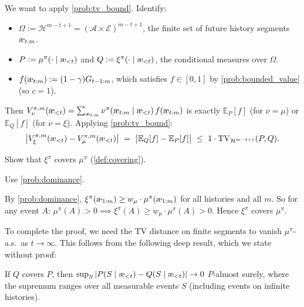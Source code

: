 \documentclass[fontsize=11pt, parskip=half]{scrartcl}
\newcommand{\cA}{\mathcal{A}}
\newcommand{\cE}{\mathcal{E}}
\newcommand{\cH}{\mathcal{H}}
\newcommand{\Ex}{\mathbb{E}}
\newcommand{\TV}[1][]{\mathrm{TV}_{#1}}
\newcommand{\aes}{\textnormal{\ae}}
\begin{document}
\begin{solution}
We want to apply \cref{prob:tv_bound}. Identify:
\begin{itemize}\itemsep=2pt
    \item $\Omega := \cH^{m-t+1} = (\cA \times \cE)^{m-t+1}$, the finite set of future history segments $\aes_{t:m}$.
    \item $P := \mu^\pi(\cdot \mid \aes_{<t})$ and $Q := \xi^\pi(\cdot \mid \aes_{<t})$, the conditional measures over $\Omega$.
    \item $f(\aes_{t:m}) := (1-\gamma)G_{t-1:m}$, which satisfies $f \in [0,1]$ by \cref{prob:bounded_value} (so $c = 1$).
\end{itemize}
Then $V_\nu^{\pi,m}(\aes_{<t}) = \sum_{\aes_{t:m}} \nu^\pi(\aes_{t:m} \mid \aes_{<t})\, f(\aes_{t:m})$ is exactly $\Ex_P[f]$ (for $\nu = \mu$) or $\Ex_Q[f]$ (for $\nu = \xi$).
Applying \cref{prob:tv_bound}:
\[
    \big|V_\xi^{\pi,m}(\aes_{<t}) - V_\mu^{\pi,m}(\aes_{<t})\big|
    ~=~ \big|\Ex_Q[f] - \Ex_P[f]\big|
    ~\leq~ 1 \cdot \TV[\cH^{m-t+1}](P, Q).
\]
\end{solution}

\begin{exercise}[Covering]
\label{prob:covering_proof}
Show that $\xi^\pi$ covers $\mu^\pi$ (\cref{def:covering}).


\begin{hint}
Use \cref{prob:dominance}.
\end{hint}
\end{exercise}

\begin{solution}
By \cref{prob:dominance}, $\xi^\pi(\aes_{1:m}) \geq w_\mu \cdot \mu^\pi(\aes_{1:m})$ for all histories and all $m$.
So for any event $A$: $\mu^\pi(A) > 0 \implies \xi^\pi(A) \geq w_\mu \cdot \mu^\pi(A) > 0$.
Hence $\xi^\pi$ covers $\mu^\pi$.
\end{solution}

To complete the proof, we need the TV distance on finite segments to vanish $\mu^\pi$-a.s.\ as $t \to \infty$.
This follows from the following deep result, which we state without proof:

\begin{fact}\label{fact:BD}
If $Q$ covers $P$, then
$\sup_S |P(S \mid \aes_{<t}) - Q(S \mid \aes_{<t})| \to 0$ $P$-almost surely,
where the supremum ranges over all measurable events $S$ (including events on infinite histories).
\end{fact}
\end{document}
